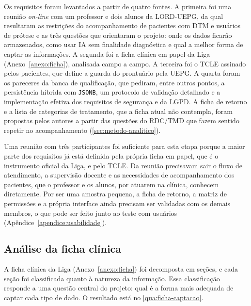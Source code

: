 Os requisitos foram levantados a partir de quatro fontes. A primeira foi uma reunião \textit{on-line} com um professor e dois alunos da LORD-UEPG, da qual resultaram as restrições do acompanhamento de pacientes com DTM e usuários de prótese e as três questões que orientaram o projeto: onde os dados ficarão armazenados, como usar IA sem finalidade diagnóstica e qual a melhor forma de captar as informações. A segunda foi a ficha clínica em papel da Liga (Anexo~\ref{anexo:ficha}), analisada campo a campo. A terceira foi o TCLE assinado pelos pacientes, que define a guarda do prontuário pela UEPG. A quarta foram os pareceres da banca de qualificação, que pediram, entre outros pontos, a persistência híbrida com \texttt{JSONB}, um protocolo de validação detalhado e a implementação efetiva dos requisitos de segurança e da LGPD. A ficha de retorno e a lista de categorias de tratamento, que a ficha atual não contempla, foram propostas pelos autores a partir das questões do RDC/TMD que fazem sentido repetir no acompanhamento (\autoref{sec:metodo-analitico}).

Uma reunião com três participantes foi suficiente para esta etapa porque a maior parte dos requisitos já está definida pela própria ficha em papel, que é o instrumento oficial da Liga, e pelo TCLE. Da reunião precisavam sair o fluxo de atendimento, a supervisão docente e as necessidades de acompanhamento dos pacientes, que o professor e os alunos, por atuarem na clínica, conhecem diretamente. Por ser uma amostra pequena, a ficha de retorno, a matriz de permissões e a própria interface ainda precisam ser validadas com os demais membros, o que pode ser feito junto ao teste com usuários (Apêndice~\ref{apendice:usabilidade}).

\subsection{Análise da ficha clínica}
\label{sec:ficha}

A ficha clínica da Liga (Anexo~\ref{anexo:ficha}) foi decomposta em seções, e cada seção foi classificada quanto à natureza da informação. Essa classificação responde a uma questão central do projeto: qual é a forma mais adequada de captar cada tipo de dado. O resultado está no \autoref{qua:ficha-captacao}.

